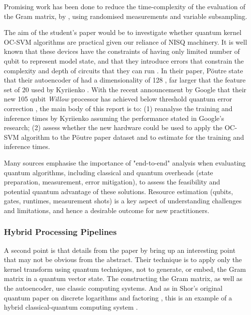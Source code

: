 Promising work has been done to reduce the time-complexity of the evaluation of the Gram matrix, 
by \citeauthor{Kolle:2023} \cite{Kolle:2023}, using randomised measurements and variable subsampling.

The aim of the student's paper would be to investigate whether quantum kernel OC-SVM algorithms are practical 
given our reliance of NISQ machinery.
It is well known that these devices have the constraints of having only limited number of qubit to represent model state,
and that they introduce errors that constrain the complexity and depth of circuits that they can run \cite{Preskill:2018}.
In their paper, P\"{o}utre state that their autoencoder of had a dimensionality of 128 \cite{Poutre:2024},
far larger that the feature set of 20 used by Kyriienko \cite{Kyriienko:2022}.
With the recent announcement by Google that their new 105 qubit \emph{Willow} processor has
achieved below threshold quantum error correction \cite{Google:Willow:2024}, the main body of this report is to: 
(1) reanalyse the training and inference times by Kyriienko assuming the performance stated in Google's research;
(2) assess whether the new hardware could be used to apply the OC-SVM algorithm to the P\"{o}utre paper dataset
and to estimate for the training and inference times.

Many sources emphasise the importance of "end-to-end" analysis when evaluating quantum \cite{Dalzell:2023} \cite{Morales:2025}
algorithms, including classical and quantum overheads (state preparation, measurement, error mitigation),
to assess the feasibility and potential quantum advantage of these solutions.  
Resource estimation (qubits, gates, runtimes, measurement shots) 
is a key aspect of understanding challenges and limitations,
and hence a desirable outcome for new practitioners.

\subsubsection{Hybrid Processing Pipelines}

A second point is that details from the paper by \citeauthor{Kyriienko:2022} 
bring up an interesting point that may not be obvious from the abstract. 
Their technique is to apply only the kernel transform using quantum techniques, 
not to generate, or embed, the Gram matrix in a quantum vector state.
The constructing the Gram matrix, as well as the autoencoder, use classic computing systems. 
And as in Shor's original quantum paper on discrete logarithms and factoring \cite{Shor:1997},
this is an example of a hybrid classical-quantum computing system \cite{Preskill:2023}.

